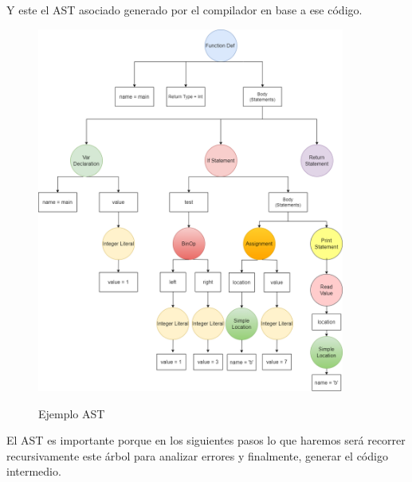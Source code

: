 \newpage Y este el AST asociado generado por el compilador en base a ese código.
\begin{figure}[h]
    \centering
    \includegraphics[width=0.9\textwidth,keepaspectratio]{img/asttree_latexexample.png} 
    \parbox{\linewidth}{\centering Ejemplo AST}
    \label{fig:mi_imagen}
\end{figure}

\newpage
El AST es importante porque en los siguientes pasos lo que haremos será recorrer recursivamente este árbol para analizar errores y finalmente, generar el código intermedio.
